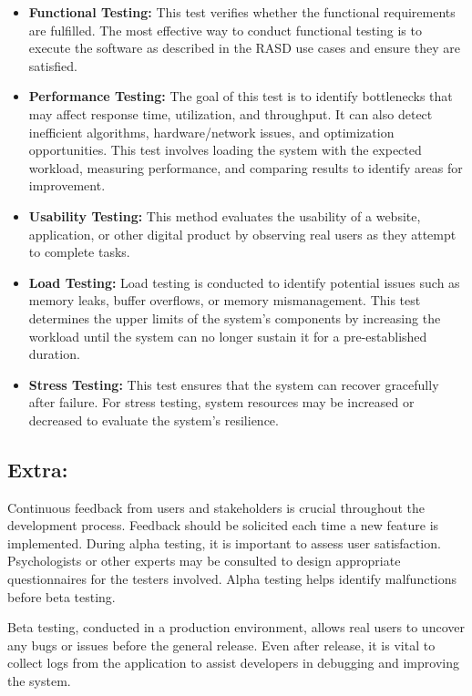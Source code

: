 \begin{itemize}
    \item \textbf{Functional Testing:} This test verifies whether the functional requirements are fulfilled. The most effective way to conduct functional testing is to execute the software as described in the RASD use cases and ensure they are satisfied.

    \item \textbf{Performance Testing:} The goal of this test is to identify bottlenecks that may affect response time, utilization, and throughput. It can also detect inefficient algorithms, hardware/network issues, and optimization opportunities. This test involves loading the system with the expected workload, measuring performance, and comparing results to identify areas for improvement.

    \item \textbf{Usability Testing:} This method evaluates the usability of a website, application, or other digital product by observing real users as they attempt to complete tasks.

    \item \textbf{Load Testing:} Load testing is conducted to identify potential issues such as memory leaks, buffer overflows, or memory mismanagement. This test determines the upper limits of the system's components by increasing the workload until the system can no longer sustain it for a pre-established duration.

    \item \textbf{Stress Testing:} This test ensures that the system can recover gracefully after failure. For stress testing, system resources may be increased or decreased to evaluate the system's resilience.
\end{itemize}

\subsection{Extra:}

Continuous feedback from users and stakeholders is crucial throughout the development process. Feedback should be solicited each time a new feature is implemented. During alpha testing, it is important to assess user satisfaction. Psychologists or other experts may be consulted to design appropriate questionnaires for the testers involved. Alpha testing helps identify malfunctions before beta testing.

Beta testing, conducted in a production environment, allows real users to uncover any bugs or issues before the general release. Even after release, it is vital to collect logs from the application to assist developers in debugging and improving the system.
